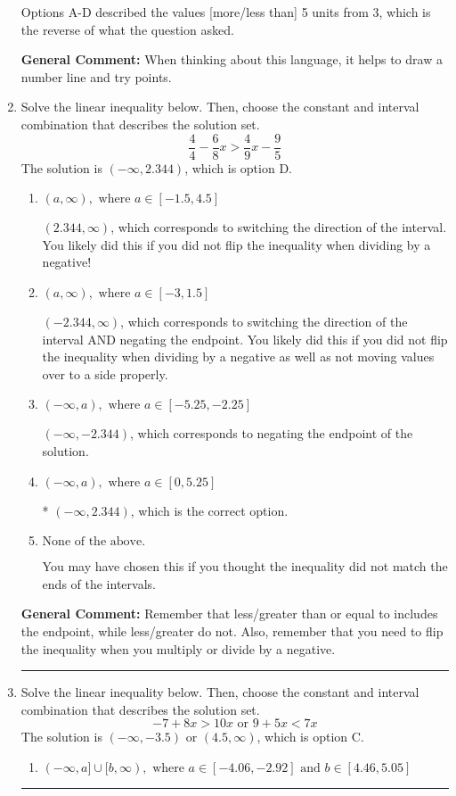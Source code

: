 \documentclass{extbook}[14pt]
\newcommand{\litem}[1]{\item #1

\rule{\textwidth}{0.4pt}}
\begin{document}
\begin{enumerate}
{\begin{enumerate}[label=\Alph*.]
Options A-D described the values [more/less than] 5 units from 3, which is the reverse of what the question asked.
\end{enumerate}

\textbf{General Comment:} When thinking about this language, it helps to draw a number line and try points.
}
\litem{
Solve the linear inequality below. Then, choose the constant and interval combination that describes the solution set.
\[ \frac{4}{4} - \frac{6}{8} x > \frac{4}{9} x - \frac{9}{5} \]The solution is \( (-\infty, 2.344) \), which is option D.\begin{enumerate}[label=\Alph*.]
\item \( (a, \infty), \text{ where } a \in [-1.5, 4.5] \)

 $(2.344, \infty)$, which corresponds to switching the direction of the interval. You likely did this if you did not flip the inequality when dividing by a negative!
\item \( (a, \infty), \text{ where } a \in [-3, 1.5] \)

 $(-2.344, \infty)$, which corresponds to switching the direction of the interval AND negating the endpoint. You likely did this if you did not flip the inequality when dividing by a negative as well as not moving values over to a side properly.
\item \( (-\infty, a), \text{ where } a \in [-5.25, -2.25] \)

 $(-\infty, -2.344)$, which corresponds to negating the endpoint of the solution.
\item \( (-\infty, a), \text{ where } a \in [0, 5.25] \)

* $(-\infty, 2.344)$, which is the correct option.
\item \( \text{None of the above}. \)

You may have chosen this if you thought the inequality did not match the ends of the intervals.
\end{enumerate}

\textbf{General Comment:} Remember that less/greater than or equal to includes the endpoint, while less/greater do not. Also, remember that you need to flip the inequality when you multiply or divide by a negative.
}
\litem{
Solve the linear inequality below. Then, choose the constant and interval combination that describes the solution set.
\[ -7 + 8 x > 10 x \text{ or } 9 + 5 x < 7 x \]The solution is \( (-\infty, -3.5) \text{ or } (4.5, \infty) \), which is option C.\begin{enumerate}[label=\Alph*.]
\item \( (-\infty, a] \cup [b, \infty), \text{ where } a \in [-4.06, -2.92] \text{ and } b \in [4.46, 5.05] \)


\end{enumerate}}
\end{enumerate}
\end{document}
